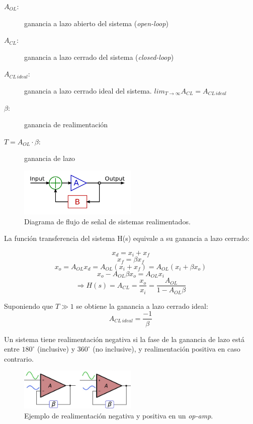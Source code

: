 \documentclass[../../main.tex]{subfiles}
\begin{document}
\begin{description}
	\item[$A_{OL}$:] ganancia a lazo abierto del sistema (\textit{open-loop})
	\item[$A_{CL}$:] ganancia a lazo cerrado del sistema (\textit{closed-loop})
	\item[$A_{CL\,ideal}$:] ganancia a lazo cerrado ideal del sistema. $lim_{T\rightarrow \infty}A_{CL} = A_{CL\,ideal}$
	\item[$\beta$:] ganancia de realimentaci\'on
	\item[$T=A_{OL}\cdot\beta$:] ganancia de lazo
\end{description}

\begin{figure}[htbp] %
	\centering
	\includegraphics[width=0.5\textwidth]{imagenes/Ideal_feedback_model.png}
	\caption{Diagrama de flujo de se\~nal de sistemas realimentados.}
	\label{fig:ej_3_realimentacion}
\end{figure}


La funci\'on transferencia del sistema H(s) equivale a su ganancia a lazo cerrado:

\[x_d = x_i+x_f\]
\[x_f = \beta x_f\]
\[x_o = A_{OL}x_d = A_{OL}\left( x_i+x_f \right) =  A_{OL}\left( x_i+\beta x_o \right)\]
\[x_o - A_{OL} \beta x_o = A_{OL} x_i\]
\begin{equation}
	\Rightarrow H(s) = A_{CL} = \frac{x_o}{x_i} = \frac{A_{OL}}{1-A_{OL}\beta}
	\label{eq:ej_3_ACL}
\end{equation}

Suponiendo que $T\gg 1$ se obtiene la ganancia a lazo cerrado ideal:
\begin{equation}
	A_{CL\,ideal} = \frac{-1}{\beta}
	\label{eq:ej_3_ACL_IDEAL}
\end{equation}

Un sistema tiene realimentaci\'on negativa si la fase de la ganancia de lazo est\'a entre $180^\circ$ (inclusive) y $360^\circ$ (no inclusive), y realimentaci\'on positiva en caso contrario.

\begin{figure}[htbp] %
	\centering
	\includegraphics[width=0.5\textwidth]{imagenes/pos_vs_neg_feedback.png}
	\caption{Ejemplo de realimentaci\'on negativa y positiva en un \textit{op-amp}.}
	\label{fig:ej_3_realimentacion_pos_vs_neg_opamp}
\end{figure}
\end{document}
